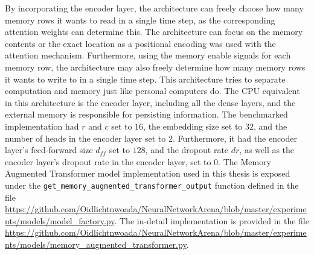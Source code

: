 \documentclass[draft,final]{vutinfth} %
\begin{document}
    By incorporating the encoder layer, the architecture can freely choose how many memory rows it wants to read in a single time step, as the corresponding attention weights can determine this.
    The architecture can focus on the memory contents or the exact location as a positional encoding was used with the attention mechanism.
    Furthermore, using the memory enable signals for each memory row, the architecture may also freely determine how many memory rows it wants to write to in a single time step.
    This architecture tries to separate computation and memory just like personal computers do.
    The CPU equivalent in this architecture is the encoder layer, including all the dense layers, and the external memory is responsible for persisting information.
    The benchmarked implementation had $r$ and $c$ set to $16$, the embedding size set to $32$, and the number of heads in the encoder layer set to $2$. Furthermore, it had the encoder layer's feed-forward size $d_{ff}$ set to $128$, and the dropout rate $dr$, as well as the encoder layer's dropout rate in the encoder layer, set to $0$.
    The Memory Augmented Transformer model implementation used in this thesis is exposed under the \texttt{get\_memory\_augmented\_transformer\_output} function defined in the file \url{https://github.com/Oidlichtnwoada/NeuralNetworkArena/blob/master/experiments/models/model_factory.py}.
    The in-detail implementation is provided in the file \url{https://github.com/Oidlichtnwoada/NeuralNetworkArena/blob/master/experiments/models/memory_augmented_transformer.py}.
\end{document}
